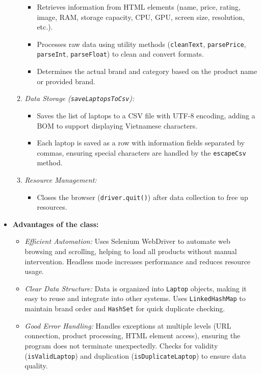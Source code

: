 \documentclass{article}
\begin{document}
\begin{itemize}
\begin{enumerate}
        \begin{itemize}
            \item Retrieves information from HTML elements (name, price, rating, image, RAM, storage capacity, CPU, GPU, screen size, resolution, etc.).
            \item Processes raw data using utility methods (\texttt{cleanText}, \texttt{parsePrice}, \texttt{parseInt}, \texttt{parseFloat}) to clean and convert formats.
            \item Determines the actual brand and category based on the product name or provided brand.
        \end{itemize}
        \item \textit{Data Storage (\texttt{saveLaptopsToCsv}):}
        \begin{itemize}
            \item Saves the list of laptops to a CSV file with UTF-8 encoding, adding a BOM to support displaying Vietnamese characters.
            \item Each laptop is saved as a row with information fields separated by commas, ensuring special characters are handled by the \texttt{escapeCsv} method.
        \end{itemize}
        \item \textit{Resource Management:}
        \begin{itemize}
            \item Closes the browser (\texttt{driver.quit()}) after data collection to free up resources.
        \end{itemize}
    \end{enumerate}
    \item \textbf{Advantages of the class:}
    \begin{itemize}
        \item \textit{Efficient Automation:} Uses Selenium WebDriver to automate web browsing and scrolling, helping to load all products without manual intervention. Headless mode increases performance and reduces resource usage.
        \item \textit{Clear Data Structure:} Data is organized into \texttt{Laptop} objects, making it easy to reuse and integrate into other systems. Uses \texttt{LinkedHashMap} to maintain brand order and \texttt{HashSet} for quick duplicate checking.
        \item \textit{Good Error Handling:} Handles exceptions at multiple levels (URL connection, product processing, HTML element access), ensuring the program does not terminate unexpectedly. Checks for validity (\texttt{isValidLaptop}) and duplication (\texttt{isDuplicateLaptop}) to ensure data quality.

\end{itemize}
\end{itemize}
\end{document}

